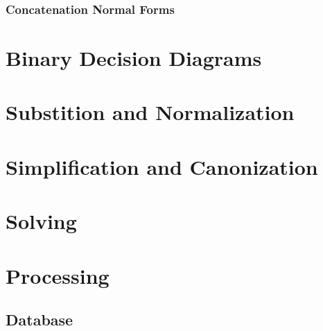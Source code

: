 \documentclass[12pt]{article}
\begin{document}
  
  

  \subsubsection{Concatenation Normal Forms}\label{sec:cnf}

  

  


\section{Binary Decision Diagrams}\label{sec:bdd}






\section{Substition and Normalization}\label{sec:subst}

 

  


\section{Simplification and Canonization}\label{sec:can}

 

 

\section{Solving}\label{sec:solve}

 

 


\section{Processing}\label{sec:process}

 \subsection{Database}\label{subsec:database}

 
\end{document}
